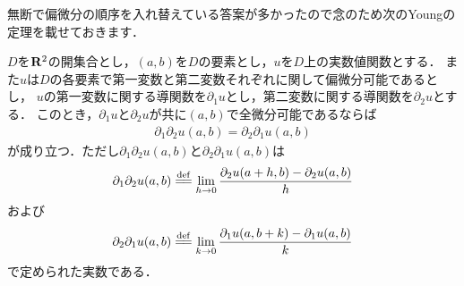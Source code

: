 	無断で偏微分の順序を入れ替えている答案が多かったので念のため次のYoungの定理を載せておきます．
	
	\begin{screen}
		\begin{thm}[偏導関数が全微分可能なら偏微分は順序を替えても等しい]
			$D$を$\mathbf{R}^2$の開集合とし，$(a,b)$を$D$の要素とし，$u$を$D$上の実数値関数とする．
			また$u$は$D$の各要素で第一変数と第二変数それぞれに関して偏微分可能であるとし，
			$u$の第一変数に関する導関数を$\partial_1 u$とし，第二変数に関する導関数を$\partial_2 u$とする．
			このとき，$\partial_1 u$と$\partial_2 u$が共に$(a,b)$で全微分可能であるならば
			\begin{align}
				\partial_1 \partial_2 u(a,b) = \partial_2 \partial_1 u(a,b)
			\end{align}
			が成り立つ．ただし$\partial_1 \partial_2 u(a,b)$と$\partial_2 \partial_1 u(a,b)$は
			\begin{align}
				\partial_1 \partial_2 u(a,b) \defeq \lim_{h \to 0} \frac{\partial_2 u(a+h,b) - \partial_2 u(a,b)}{h}
			\end{align}
			および
			\begin{align}
				\partial_2 \partial_1 u(a,b) \defeq \lim_{k \to 0} \frac{\partial_1 u(a,b+k) - \partial_1 u(a,b)}{k}
			\end{align}
			で定められた実数である．
		\end{thm}
	\end{screen}
	

